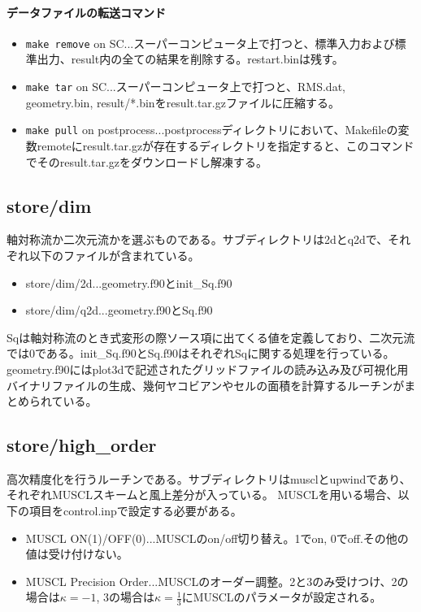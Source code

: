 \documentclass{jsarticle}
\begin{document}
\paragraph{データファイルの転送コマンド}
\begin{itemize}
\item \verb|make remove| on SC...スーパーコンピュータ上で打つと、標準入力および標準出力、result内の全ての結果を削除する。restart.binは残す。
\item \verb|make tar| on SC...スーパーコンピュータ上で打つと、RMS.dat, geometry.bin, result/*.binをresult.tar.gzファイルに圧縮する。
\item \verb|make pull| on postprocess...postprocessディレクトリにおいて、Makefileの変数remoteにresult.tar.gzが存在するディレクトリを指定すると、このコマンドでそのresult.tar.gzをダウンロードし解凍する。
\end{itemize}
\subsection{store/dim}%
軸対称流か二次元流かを選ぶものである。サブディレクトリは2dとq2dで、それぞれ以下のファイルが含まれている。
\begin{itemize}
\item store/dim/2d...geometry.f90とinit\_Sq.f90
\item store/dim/q2d...geometry.f90とSq.f90
\end{itemize}
Sqは軸対称流のとき式変形の際ソース項に出てくる値を定義しており、二次元流では0である。init\_Sq.f90とSq.f90はそれぞれSqに関する処理を行っている。
geometry.f90にはplot3dで記述されたグリッドファイルの読み込み及び可視化用バイナリファイルの生成、幾何ヤコビアンやセルの面積を計算するルーチンがまとめられている。
\subsection{store/high\_order}%
高次精度化を行うルーチンである。サブディレクトリはmusclとupwindであり、それぞれMUSCLスキームと風上差分が入っている。
MUSCLを用いる場合、以下の項目をcontrol.inpで設定する必要がある。
\begin{itemize}
\item MUSCL ON(1)/OFF(0)...MUSCLのon/off切り替え。1でon, 0でoff.その他の値は受け付けない。
\item MUSCL Precision Order...MUSCLのオーダー調整。2と3のみ受けつけ、2の場合は$\kappa =-1$, 3の場合は$\kappa=\frac 1 3$にMUSCLのパラメータが設定される。
\end{itemize}
\end{document}
